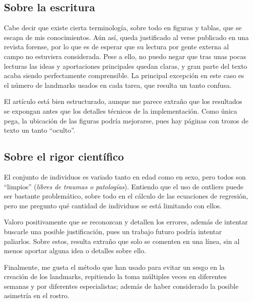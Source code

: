 \documentclass[13pt,a4paper]{article}
\begin{document}
\subsection{Sobre la escritura}

Cabe decir que existe cierta terminología, sobre todo en figuras y tablas, que se escapa de mis conocimientos. Aún así, queda justificado al verse publicado en una revista forense, por lo que es de esperar que su lectura por gente externa al campo no estuviera considerada. Pese a ello, no puedo negar que tras unas pocas lecturas las ideas y aportaciones principales quedan claras, y gran parte del texto acaba siendo perfectamente comprensible. La principal excepción en este caso es el número de landmarks usados en cada tarea, que resulta un tanto confusa.


El artículo está bien estructurado, aunque me parece extraño que los resultados se expongan antes que los detalles técnicos de la implementación. Como única pega, la ubicación de las figuras podría mejorarse, pues hay páginas con trozos de texto un tanto ``oculto''.

\subsection{Sobre el rigor científico} %

El conjunto de individuos es variado tanto en edad como en sexo, pero todos son ``limpios'' (\textit{libres de traumas o patologías}). Entiendo que el uso de outliers puede ser bastante problemático, sobre todo en el cálculo de las ecuaciones de regresión, pero me pregunto qué cantidad de individuos se está limitando con ellos.


Valoro positivamente que se reconozcan y detallen los errores, además de intentar buscarle una posible justificación, pues un trabajo futuro podría intentar paliarlos.
Sobre estos, resulta extraño que solo se comenten en una línea, sin al menos aportar alguna idea o detalles sobre ello.


Finalmente, me gusta el método que han usado para evitar un sesgo en la creación de los landmarks, repitiendo la toma múltiples veces en diferentes semanas y por diferentes especialistas; además de haber considerado la posible asimetría en el rostro.


    \setlength{\parskip}{1em}
    \newpage
\end{document}
